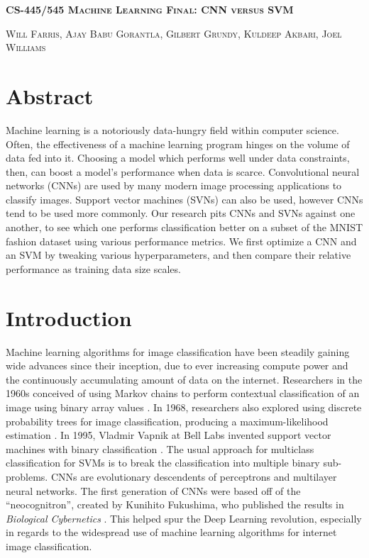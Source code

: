 \documentclass[12pt]{article}
\begin{document}
\begin{center}
{\large \textbf{\textsc{CS-445/545 Machine Learning Final: CNN versus SVM}}}

\bigskip

\textsc{Will Farris, Ajay Babu Gorantla, Gilbert Grundy, Kuldeep Akbari, Joel Williams}
\end{center}

\section{Abstract}

Machine learning is a notoriously data-hungry field within computer science. Often, the effectiveness of a machine learning program hinges on the volume of data fed into it. Choosing a model which performs well under data constraints, then, can boost a model’s performance when data is scarce. Convolutional neural networks (CNNs) are used by many modern image processing applications to classify images. Support vector machines (SVNs) can also be used, however CNNs tend to be used more commonly. Our research pits CNNs and SVNs against one another, to see which one performs classification better on a subset of the MNIST fashion dataset using various performance metrics. We first optimize a CNN and an SVM by tweaking various hyperparameters, and then compare their relative performance as training data size scales.

\section{Introduction}

Machine learning algorithms for image classification have been steadily gaining wide advances since their inception, due to ever increasing compute power and the continuously accumulating amount of data on the internet. Researchers in the 1960s conceived of using Markov chains to perform contextual classification of an image using binary array values \cite{1053827}. In 1968, researchers also explored using discrete probability trees for image classification, producing a maximum-likelihood estimation \cite{chow1968approximating}. In 1995, Vladmir Vapnik at Bell Labs invented support vector machines with binary classification \cite{cortes1995support}. The usual approach for multiclass classification for SVMs is to break the classification into multiple binary sub-problems. CNNs are evolutionary descendents of perceptrons and multilayer neural networks. The first generation of CNNs were based off of the “neocognitron”, created by Kunihito Fukushima, who published the results in \textit{Biological Cybernetics} \cite{fukushima1982neocognitron}. This helped spur the Deep Learning revolution, especially in regards to the widespread use of machine learning algorithms for internet image classification.
\end{document}
